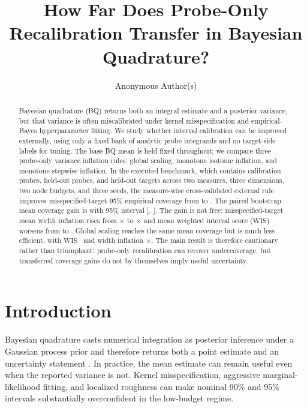 \documentclass{article}
\title{How Far Does Probe-Only Recalibration Transfer in Bayesian Quadrature?}
\author{Anonymous Author(s)}
\newcommand{\wis}{\ensuremath{\mathrm{WIS}}}
\begin{document}
\maketitle

\begin{abstract}
Bayesian quadrature (BQ) returns both an integral estimate and a posterior variance, but that variance is often miscalibrated under kernel misspecification and empirical-Bayes hyperparameter fitting. We study whether interval calibration can be improved externally, using only a fixed bank of analytic probe integrands and no target-side labels for tuning. The base BQ mean is held fixed throughout; we compare three probe-only variance inflation rules: global scaling, monotone isotonic inflation, and monotone stepwise inflation. In the executed benchmark, which contains \CalibrationProbeCount{} calibration probes, \HeldoutProbeCount{} held-out probes, and \TargetCount{} held-out targets across two measures, three dimensions, two node budgets, and three seeds, the measure-wise cross-validated external rule improves misspecified-target 95\% empirical coverage from \MissUncalCoverage{} to \MissSelectedCoverage{}. The paired bootstrap mean coverage gain is \SelectedVsUncalCoverageDiffMean{} with 95\% interval [\SelectedVsUncalCoverageDiffLower{}, \SelectedVsUncalCoverageDiffUpper{}]. The gain is not free: misspecified-target mean width inflation rises from \MissUncalWidthInfl{}$\times$ to \MissSelectedWidthInfl{}$\times$ and mean weighted interval score (\wis) worsens from \MissUncalWIS{} to \MissSelectedWIS{}. Global scaling reaches the same mean coverage but is much less efficient, with \wis\ \MissGlobalWIS{} and width inflation \MissGlobalWidthInfl{}$\times$. The main result is therefore cautionary rather than triumphant: probe-only recalibration can recover undercoverage, but transferred coverage gains do not by themselves imply useful uncertainty.
\end{abstract}

\section{Introduction}
Bayesian quadrature casts numerical integration as posterior inference under a Gaussian process prior and therefore returns both a point estimate and an uncertainty statement \citep{ohagan1991bayes,briol2019probabilistic}. In practice, the mean estimate can remain useful even when the reported variance is not. Kernel misspecification, aggressive marginal-likelihood fitting, and localized roughness can make nominal 90\% and 95\% intervals substantially overconfident in the low-budget regime.
\end{document}

